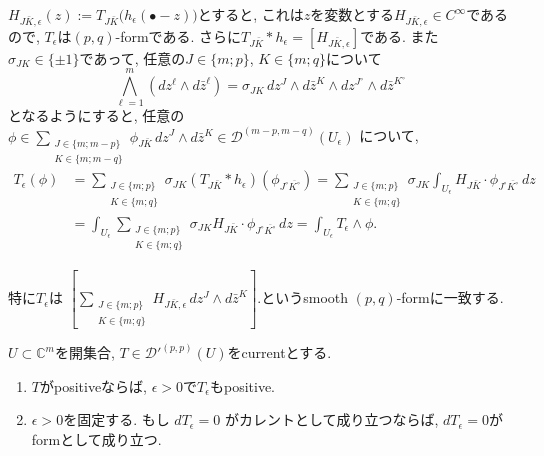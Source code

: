 \begin{rem}
\label{rem-H-5.13}
$H_{J\bar K,\epsilon} (z):=T_{J\bar K}\bigl(h_\epsilon(\bullet-z)\bigr)$とすると, これは$z$を変数とする$H_{J\bar K,\epsilon}\in C^\infty$であるので, 
$T_\epsilon$は$(p,q)$-formである. 
さらに$T_{J\bar K}*h_\epsilon=[H_{J\bar K,\epsilon}]$である. 
また $\sigma_{JK}\in\{\pm1\}$であって, 任意の$J\in\{m;p\}$, $K\in\{m;q\}$について
\begin{equation*}
\bigwedge_{\ell=1}^m
\left(dz^\ell\wedge d\bar z^\ell\right)
=
\sigma_{JK}\,
dz^J\wedge d\bar z^K\wedge
dz^{J^\circ}\wedge d\bar z^{K^\circ}
\end{equation*}
となるようにすると, 
任意の$\phi\in
\sum_{\substack{J\in\{m;m-p\}\\K\in\{m;m-q\}}}
\phi_{J\bar K}\,dz^J\wedge d\bar z^K
\in\mathcal{D}^{(m-p,m-q)}(U_\epsilon)$
について, 
\begin{align*}
T_\epsilon(\phi)
&=
\sum_{\substack{J\in\{m;p\}\\K\in\{m;q\}}}
\sigma_{JK}(T_{J\bar K}*h_\epsilon)
\left(\phi_{J^\circ\overline{K^\circ}}\right)
=
\sum_{\substack{J\in\{m;p\}\\K\in\{m;q\}}}
\sigma_{JK}
\int_{U_\epsilon}
H_{J\bar K}\cdot
\phi_{J^\circ\overline{K^\circ}}\,dz\\
&=
\int_{U_\epsilon}
\sum_{\substack{J\in\{m;p\}\\K\in\{m;q\}}}
\sigma_{JK}H_{J\bar K}\cdot
\phi_{J^\circ\overline{K^\circ}}\,dz
=
\int_{U_\epsilon}T_\epsilon\wedge\phi.
\end{align*}

特に$T_\epsilon$は
$
\left[
\sum_{\substack{J\in\{m;p\}\\K\in\{m;q\}}}
H_{J\bar K,\epsilon}\,dz^J\wedge d\bar z^K
\right].
$というsmooth $(p,q)$-formに一致する. 
\end{rem}



\begin{tcolorbox}[mybox]
\begin{lem}
\label{lem-H-5.14}
$U\subset\mathbb{C}^m$を開集合, 
$T\in\mathcal{D}'^{(p,p)}(U)$をcurrentとする. 
\begin{enumerate}
\item  $T$がpositiveならば, $\epsilon>0$で$T_\epsilon$もpositive.
\item  $\epsilon>0$を固定する. もし $dT_\epsilon=0$ がカレントとして成り立つならば, $dT_\epsilon=0$がformとして成り立つ. 
\end{enumerate}
\end{lem}
\end{tcolorbox}

